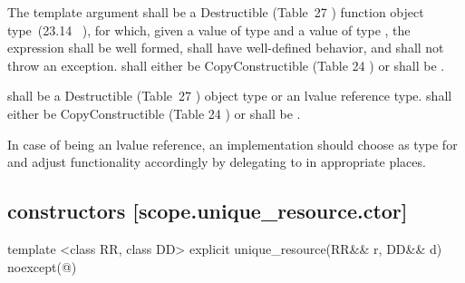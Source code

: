\documentclass[ebook,11pt,article]{memoir}
\begin{document}
\pnum 
The template argument
 shall be a 
Destructible 
(Table~27
) function object type~(23.14~
), 
for which, given
a value  of type  and a value
 of type , the expression
 shall be well formed, shall have well-defined behavior, and shall not throw an exception.
 shall either be CopyConstructible (Table 24
) or  shall be .

\pnum
{} shall be a
Destructible 
(Table~27
) object type 
or an lvalue reference type.
 shall either be CopyConstructible (Table 24
) or  shall be .

\pnum
\begin{note} 
In case of  being an lvalue reference, an implementation should choose  as type for  and adjust functionality accordingly by delegating to  in appropriate places. 
\end{note}

\subsection { constructors [scope.unique_resource.ctor]}


\begin{itemdecl}
template <class RR, class DD>
explicit 
unique_resource(RR&& r, DD&& d) noexcept(@\seebelow@)
\end{itemdecl}
\end{document}
